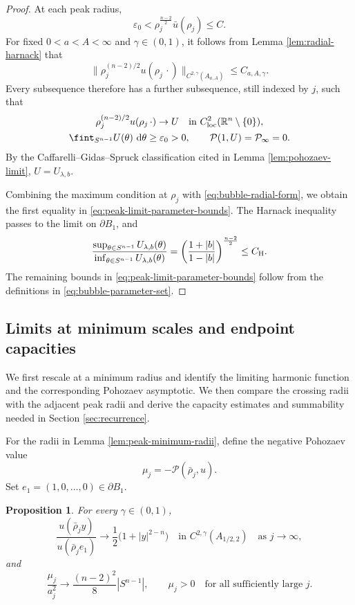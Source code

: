 \documentclass[11pt]{article}
\numberwithin{equation}{section}
\newtheorem{proposition}[theorem]{Proposition}
\theoremstyle{remark}
\newcommand{\R}{\mathbb R}
\newcommand{\Sph}{S}
\newcommand{\cP}{\mathcal P}
\newcommand{\pa}{\partial}
\newcommand{\eps}{\varepsilon}
\newcommand{\dd}{\mathop{}\!\mathrm{d}}
\begin{document}
\par
\begin{proof}
At each peak radius,
\[
 \eps_0<\rho_j^{\frac{n-2}{2}}\bar u(\rho_j)\le C.
\]
For fixed \(0<a<A<\infty\) and \(\gamma\in(0,1)\),
{it follows from Lemma  \ref{lem:radial-harnack} that}
\[
 \|\rho_j^{(n-2)/2}u(\rho_j\,\cdot)\|_{C^{2,\gamma}(A_{a,A})}
 \le C_{a,A,\gamma}.
\]
Every subsequence therefore has a further subsequence, still indexed by
\(j\), such that
 {
\[
 \begin{gathered}
 \rho_j^{(n-2)/2}u(\rho_j\,\cdot)\to U
 \quad\text{in }C^2_{\rm loc}(\R^n\setminus\{0\}),\\
 \fint_{\Sph^{n-1}}U(\theta)\,\dd\theta\ge\eps_0>0,
 \qquad \cP(1,U)=\cP_\infty=0.
 \end{gathered}
\]
}
 {By the Caffarelli--Gidas--Spruck classification cited in
Lemma  \ref{lem:pohozaev-limit}, \(U=U_{\lambda,b}\).}

{Combining the maximum condition at \(\rho_j\) with
\eqref{eq:bubble-radial-form}, we obtain the first equality in}
\eqref{eq:peak-limit-parameter-bounds}. The Harnack inequality passes to the limit on
\(\pa B_1\), and
\[
 \frac{
 \sup_{\theta\in\Sph^{n-1}}U_{\lambda,b}(\theta)
 }{
 \inf_{\theta\in\Sph^{n-1}}U_{\lambda,b}(\theta)
 }
 =
 \left(\frac{1+|b|}{1-|b|}\right)^{\frac{n-2}{2}}
 \le C_{\rm H}.
\]
{The remaining bounds in
\eqref{eq:peak-limit-parameter-bounds} follow from the definitions in
\eqref{eq:bubble-parameter-set}.}
\end{proof}

\par
\subsection{Limits at minimum scales and endpoint capacities}

{
We first rescale at a minimum radius and identify the limiting harmonic
function and the corresponding Pohozaev asymptotic.  We then compare the
crossing radii with the adjacent peak radii and derive the capacity estimates
and summability needed in Section  \ref{sec:recurrence}.
}

{For the radii in Lemma  \ref{lem:peak-minimum-radii}, define
the negative Pohozaev value}
\begin{equation}\label{eq:mu-definition}
 \mu_j=-\cP(\bar\rho_j,u).
\end{equation}
Set \(e_1=(1,0,\ldots,0)\in\partial B_1\).

\begin{proposition}\label{prop:minimum-scale-limit}
{
For every \(\gamma\in(0,1)\),
\begin{equation}\label{eq:minimum-harmonic-limit}
 \frac{u(\bar\rho_jy)}{u(\bar\rho_je_1)}
 \to
 \frac12\bigl(1+|y|^{2-n}\bigr)
 \quad\text{in }C^{2,\gamma}(A_{1/2,2})
\quad\text{as }j\to\infty,
\end{equation}
and
\begin{equation}\label{eq:mu-minimum-depth}
 \frac{\mu_j}{a_j^2}
 \to
 \frac{(n-2)^2}{8}|\Sph^{n-1}|,
 \qquad
 \mu_j>0\quad\text{for all sufficiently large }j.
\end{equation}
}
\end{proposition}
\end{document}
